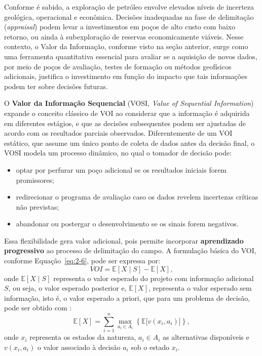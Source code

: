 Conforme é sabido, a exploração de petróleo envolve elevados níveis de incerteza geológica, operacional e econômica. Decisões inadequadas na fase de delimitação (\textit{appraisal}) podem levar a investimentos em poços de alto custo com baixo retorno, ou ainda à subexploração de reservas economicamente viáveis. Nesse contexto, o Valor da Informação, conforme visto na seção anterior, surge como uma ferramenta quantitativa essencial para avaliar se a aquisição de novos dados, por meio de poços de avaliação, testes de formação ou métodos geofísicos adicionais, justifica o investimento em função do impacto que tais informações podem ter sobre decisões futuras.

O \textbf{Valor da Informação Sequencial} (VOSI,  \textit{Value of Sequential Information}) expande o conceito clássico de VOI ao considerar que a informação é adquirida em diferentes estágios, e que as decisões subsequentes podem ser ajustadas de acordo com os resultados parciais observados. Diferentemente de um VOI estático, que assume um único ponto de coleta de dados antes da decisão final, o VOSI modela um processo dinâmico, no qual o tomador de decisão pode:
\begin{itemize}
    \item[\textbullet] optar por perfurar um poço adicional se os resultados iniciais forem promissores;
    \item[\textbullet] redirecionar o programa de avaliação caso os dados revelem incertezas críticas não previstas;
    \item[\textbullet] abandonar ou postergar o desenvolvimento se os sinais forem negativos.
\end{itemize}
Essa flexibilidade gera valor adicional, pois permite incorporar \textbf{aprendizado progressivo} ao processo de delimitação do campo. A formulação básica do VOI, conforme Equação~\eqref{eq:2-6}, pode ser expressa por:
\begin{equation}
    VOI = \mathbb{E}[X\mid S] - \mathbb{E}[X],
    \label{eq:2-21}
\end{equation}
onde $\mathbb{E}[X\mid S]$ representa o valor esperado do projeto com informação adicional~$S$, ou seja, o valor esperado posterior e, $\mathbb{E}[X]$, representa o valor esperado sem informação, isto é, o valor esperado a priori, que para um problema de decisão, pode ser obtido com \cite{09}:
\begin{equation}
    \mathbb{E}[X] = \sum_{i=1}^{n} \max_{a_i \in A_i} \left\{ \mathbb{E} \big[ v(x_i,a_i) \big] \right\},
    \label{eq:2-22}
\end{equation}
onde $x_i$ representa os estados da natureza, $a_i \in A_i$ as alternativas disponíveis e $v(x_i,a_i)$ o valor associado à decisão $a_i$ sob o estado $x_i$.

